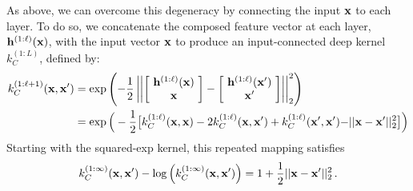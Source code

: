 \documentclass{article} %
\begin{document}
As above, we can overcome this degeneracy by connecting the input ${\bf{x}}$ to each layer.
To do so, we concatenate the composed feature vector at each layer, ${\bf{h}}^{(1:\ell)}({\bf{x}})$, with the input vector ${\bf{x}}$ to produce an input-connected deep kernel $k_C^{(1:L)}$, defined by:
%
\begin{align}
k_C^{(1:\ell + 1)}({\bf{x}}, {\bf{x}}')
& = \exp \left( -\frac{1}{2} \left|\left| 
\left[ \! \begin{array}{c} {\bf{h}}^{(1:\ell)}({\bf{x}}) \\ {\bf{x}} \end{array} \! \right] - 
\left[ \! \begin{array}{c} {\bf{h}}^{(1:\ell)}({\bf{x}}') \\ {\bf{x}}' \end{array} \! \right] \right| \right|_2^2 \right) \\
& = \exp \Big( -\frac{1}{2} \big[ k_C^{(1:\ell)}({\bf{x}}, {\bf{x}}) - 2 k_C^{(1:\ell)}({\bf{x}}, {\bf{x}}') 
 + k_C^{(1:\ell)}({\bf{x}}', {\bf{x}}') {\color{black} - || {\bf{x}} - {\bf{x}}' ||_2^2} \big] \Big) \nonumber
\end{align}
%
Starting with the squared-exp kernel, this repeated mapping satisfies
\begin{align}
k_C^{(1:\infty)}({\bf{x}}, {\bf{x}}') - \log \left( k_C^{(1:\infty)}({\bf{x}}, {\bf{x}}') \right) = 1 + \frac{1}{2} || {\bf{x}} - {\bf{x}}' ||_2^2 \,.
\end{align}
%
\end{document}
